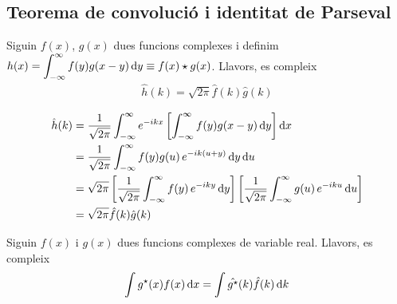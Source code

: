 \subsection{Teorema de convolució i identitat de Parseval}
\begin{thm}[de convolució]
    Siguin $f(x)$, $g(x)$ dues funcions complexes i definim $h(x) = \displaystyle \int_{-\infty}^{\infty} f(y) g(x-y) \mathop{}\!\mathrm{d} y \equiv f(x) \star g(x)$. Llavors, es compleix 
    \begin{align}
        \hat{h}(k) = \sqrt{2\pi} \hat{f}(k) \hat{g}(k)
    \end{align}
\end{thm}
\begin{sproof}
    \begin{align*}
    \begin{aligned}
        \hat{h}(k) &= \frac{1}{\sqrt{2\pi}} \int_{-\infty}^{\infty} e^{-ikx} \left[ \int_{-\infty}^{\infty} f(y) g(x-y) \mathop{}\!\mathrm{d} y \right] \mathop{}\!\mathrm{d} x \\ 
        &= \frac{1}{\sqrt{2\pi}} \int_{-\infty}^{\infty} f(y) g(u)\,e^{-ik(u+y)} \mathop{}\!\mathrm{d} y \mathop{}\!\mathrm{d} u \\
        &= \sqrt{2\pi} \left[ \frac{1}{\sqrt{2\pi}} \int_{-\infty}^{\infty} f(y)\,e^{-iky} \mathop{}\!\mathrm{d} y \right] \left[ \frac{1}{\sqrt{2\pi}} \int_{-\infty}^{\infty} g(u)\,e^{-iku} \mathop{}\!\mathrm{d} u \right] \\ 
        &= \sqrt{2\pi} \hat{f}(k) \hat{g}(k)
    \end{aligned}
    \end{align*}
\end{sproof}

\begin{thm}[de Parseval]
    Siguin $f(x)$ i $g(x)$ dues funcions complexes de variable real. Llavors, es compleix
    \begin{align}
        \int g^{\star}(x) f(x) \mathop{}\!\mathrm{d} x = \int \hat{g^{\star}}(k) \hat{f}(k) \mathop{}\!\mathrm{d} k
    \end{align}
\end{thm}

